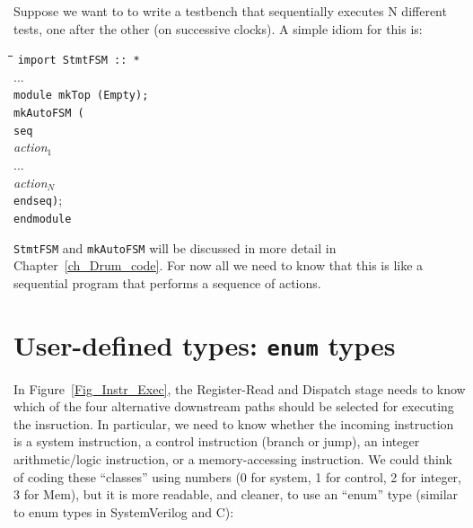 Suppose we want to to write a testbench that sequentially executes N
different tests, one after the other (on successive clocks).  A simple
idiom for this is:

{\footnotesize
\begin{tabbing}
\hmmm \= \hm \= \hm \= \hm \= \kill
      \> {\tt import StmtFSM :: *} \\
      \> ... \\
      \> {\tt module mkTop (Empty);} \\
      \>     \> {\tt mkAutoFSM (} \\
      \>     \>     \> {\tt seq} \\
      \>     \>     \>     \> \emph{action$_1$} \\
      \>     \>     \>     \> ... \\
      \>     \>     \>     \> \emph{action$_N$} \\
      \>     \>     \> {\tt endseq)}; \\
      \> {\tt endmodule}
\end{tabbing}}

{\tt StmtFSM} and \verb|mkAutoFSM| will be discussed in more detail in
Chapter~\ref{ch_Drum_code}.  For now all we need to know that this is
like a sequential program that performs a sequence of actions.




\section{User-defined types: {\tt enum} types}

\label{BSV_enum_types}


In Figure~\ref{Fig_Instr_Exec}, the Register-Read and Dispatch stage
needs to know which of the four alternative downstream paths should be
selected for executing the insruction.  In particular, we need to know
whether the incoming instruction is a system instruction, a control
instruction (branch or jump), an integer arithmetic/logic instruction,
or a memory-accessing instruction.  We could think of coding these
``classes'' using numbers (0 for system, 1 for control, 2 for integer,
3 for Mem), but it is more readable, and cleaner, to use an ``enum''
type (similar to enum types in SystemVerilog and C):

